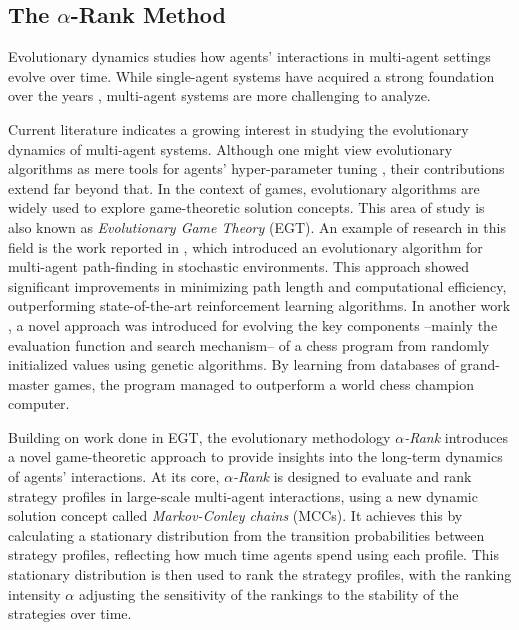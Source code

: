 \subsection{The \texorpdfstring{$\alpha$}{alpha}-Rank Method}

    Evolutionary dynamics studies how agents' interactions in multi-agent settings evolve over time. While single-agent systems have acquired a strong foundation over the years \cite{10.5555/2831071.2831085}, multi-agent systems are more challenging to analyze.\tinydouble

    \noindent
    Current literature indicates a growing interest in studying the evolutionary dynamics of multi-agent systems. Although one might view evolutionary algorithms as mere tools for agents' hyper-parameter tuning \cite{Sinha_2023}\cite{ganapathy2020studygeneticalgorithmshyperparameter}, their contributions extend far beyond that. In the context of games, evolutionary algorithms are widely used to explore game-theoretic solution concepts. This area of study is also known as \emph{Evolutionary Game Theory} (EGT). An example of research in this field is the work reported in \cite{paul2022multiagentpathfinding}, which introduced an evolutionary algorithm for multi-agent path-finding in stochastic environments. This approach showed significant improvements in minimizing path length and computational efficiency, outperforming state-of-the-art reinforcement learning algorithms. In another work \cite{David_2014}, a novel approach was introduced for evolving the key components --mainly the evaluation function and search mechanism-- of a chess program from randomly initialized values using genetic algorithms. By learning from databases of grand-master games, the program managed to outperform a world chess champion computer.\tinydouble
    
    \noindent
    Building on work done in EGT, the evolutionary methodology \emph{$\alpha$-Rank} \cite{omidshafiei2019alpharank} introduces a novel game-theoretic approach to provide insights into the long-term dynamics of agents' interactions. At its core, \emph{$\alpha$-Rank} is designed to evaluate and rank strategy profiles in large-scale multi-agent interactions, using a new dynamic solution concept called \emph{Markov-Conley chains} (MCCs). It achieves this by calculating a stationary distribution from the transition probabilities between strategy profiles, reflecting how much time agents spend using each profile. This stationary distribution is then used to rank the strategy profiles, with the ranking intensity $\alpha$ adjusting the sensitivity of the rankings to the stability of the strategies over time.


